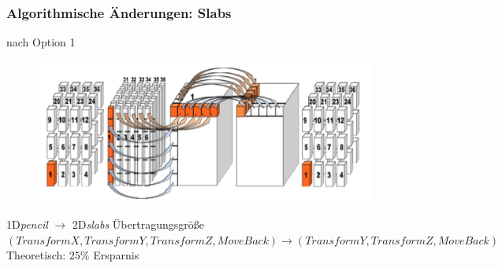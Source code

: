 {
	\frametitle{Algorithmische Änderungen: Slabs}
	nach Option 1
	\begin{figure}[h!]
		\centering
		\includegraphics[width=0.7\linewidth, keepaspectratio]{../res/algo.png}
		\footnotemark[1]
	\end{figure}
	1D\textit{pencil} $\rightarrow$ 2D\textit{slabs} Übertragungsgröße
	$(TransformX,TransformY,TransformZ,MoveBack)\rightarrow(TransformY,TransformZ,MoveBack)$
	Theoretisch: $25\%$ Ersparnis

}

